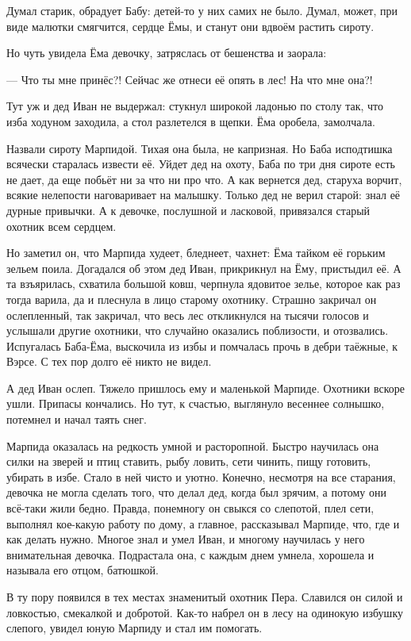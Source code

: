 \documentclass[oneside,final,14pt]{extreport}
\begin{document}
		Думал старик, обрадует Бабу: детей-то у них самих не было. Думал, может, при виде малютки смягчится, сердце Ёмы, и станут они вдвоём растить сироту.
		
		Но чуть увидела Ёма девочку, затряслась от бешенства и заорала:
		
		— Что ты мне принёс?! Сейчас же отнеси её опять в лес! На что мне она?!
		
		Тут уж и дед Иван не выдержал: стукнул широкой ладонью по столу так, что изба ходуном заходила, а стол разлетелся в щепки. Ёма оробела, замолчала.
		
		Назвали сироту Марпидой. Тихая она была, не капризная. Но Баба исподтишка всячески старалась извести её. Уйдет дед на охоту, Баба по три дня сироте есть не дает, да еще побьёт ни за что ни про что. А как вернется дед, старуха ворчит, всякие нелепости наговаривает на малышку. Только дед не верил старой: знал её дурные привычки. А к девочке, послушной и ласковой, привязался старый охотник всем сердцем.
		
		Но заметил он, что Марпида худеет, бледнеет, чахнет: Ёма тайком её горьким зельем поила. Догадался об этом дед Иван, прикрикнул на Ёму, пристыдил её. А та взъярилась, схватила большой ковш, черпнула ядовитое зелье, которое как раз тогда варила, да и плеснула в лицо старому охотнику. Страшно закричал он ослепленный, так закричал, что весь лес откликнулся на тысячи голосов и услышали другие охотники, что случайно оказались поблизости, и отозвались. Испугалась Баба-Ёма, выскочила из избы и помчалась прочь в дебри таёжные, к Вэрсе. С тех пор долго её никто не видел.
		
		А дед Иван ослеп. Тяжело пришлось ему и маленькой Марпиде. Охотники вскоре ушли. Припасы кончались. Но тут, к счастью, выглянуло весеннее солнышко, потемнел и начал таять снег.
		
		Марпида оказалась на редкость умной и расторопной. Быстро научилась она силки на зверей и птиц ставить, рыбу ловить, сети чинить, пищу готовить, убирать в избе. Стало в ней чисто и уютно. Конечно, несмотря на все старания, девочка не могла сделать того, что делал дед, когда был зрячим, а потому они всё-таки жили бедно. Правда, понемногу он свыкся со слепотой, плел сети, выполнял кое-какую работу по дому, а главное, рассказывал Марпиде, что, где и как делать нужно. Многое знал и умел Иван, и многому научилась у него внимательная девочка. Подрастала она, с каждым днем умнела, хорошела и называла его отцом, батюшкой.
		
		В ту пору появился в тех местах знаменитый охотник Пера. Славился он силой и ловкостью, смекалкой и добротой. Как-то набрел он в лесу на одинокую избушку слепого, увидел юную Марпиду и стал им помогать.
		
\end{document}

